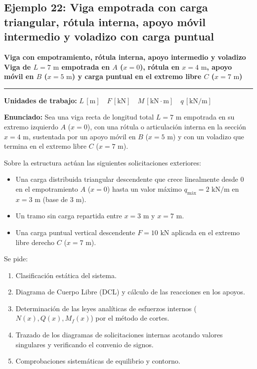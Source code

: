 \subsection{Ejemplo 22: Viga empotrada con carga triangular, rótula interna, apoyo móvil intermedio y voladizo con carga puntual}

\begin{tcolorbox}[colback=blue!3!white, colframe=blue!40!black, arc=3pt, boxrule=0.8pt, left=8pt, right=8pt, top=6pt, bottom=6pt]
    \centering
    {\Large\bfseries\color{blue!60!black} Viga con empotramiento, rótula interna, apoyo intermedio y voladizo}\\[2pt]
    {\normalsize\bfseries Viga de $L = 7\text{ m}$ empotrada en $A$ ($x=0$), rótula en $x=4\text{ m}$, apoyo móvil en $B$ ($x=5\text{ m}$) y carga puntual en el extremo libre $C$ ($x=7\text{ m}$)}

    \vspace{4pt}\hrule\vspace{4pt}
    {\small\textbf{Unidades de trabajo:} $L\,[\text{m}] \quad F\,[\text{kN}] \quad M\,[\text{kN}\cdot\text{m}] \quad q\,[\text{kN/m}]$}
\end{tcolorbox}

\textbf{Enunciado:}
Sea una viga recta de longitud total $L = 7\text{ m}$ empotrada en su extremo izquierdo $A$ ($x = 0$), con una rótula o articulación interna en la sección $x = 4\text{ m}$, sustentada por un apoyo móvil en $B$ ($x = 5\text{ m}$) y con un voladizo que termina en el extremo libre $C$ ($x = 7\text{ m}$).

Sobre la estructura actúan las siguientes solicitaciones exteriores:
\begin{itemize}
    \item Una carga distribuida triangular descendente que crece linealmente desde $0$ en el empotramiento $A$ ($x=0$) hasta un valor máximo $q_{\text{máx}} = 2\text{ kN/m}$ en $x = 3\text{ m}$ (base de $3\text{ m}$).
    \item Un tramo sin carga repartida entre $x = 3\text{ m}$ y $x = 7\text{ m}$.
    \item Una carga puntual vertical descendente $F = 10\text{ kN}$ aplicada en el extremo libre derecho $C$ ($x = 7\text{ m}$).
\end{itemize}

Se pide:
\begin{enumerate}[label=(\alph*)]
    \item Clasificación estática del sistema.
    \item Diagrama de Cuerpo Libre (DCL) y cálculo de las reacciones en los apoyos.
    \item Determinación de las leyes analíticas de esfuerzos internos ($N(x), Q(x), M_f(x)$) por el método de cortes.
    \item Trazado de los diagramas de solicitaciones internas acotando valores singulares y verificando el convenio de signos.
    \item Comprobaciones sistemáticas de equilibrio y contorno.
\end{enumerate}

